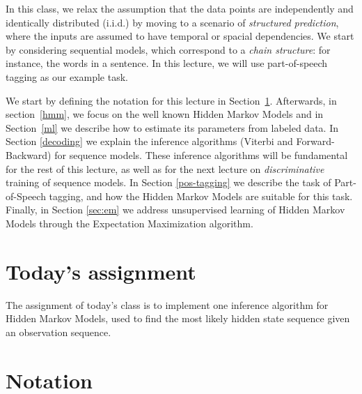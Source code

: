 

In this class, we relax the assumption that
the data points are independently and identically distributed (i.i.d.) 
by moving to a scenario of \emph{structured prediction}, where the inputs are assumed to have
temporal or spacial dependencies. We start by 
considering sequential models, which correspond to a \emph{chain structure}: for instance,
the words in a sentence. In this lecture, we will use part-of-speech
tagging as our example task.  

We start by defining the notation for this lecture in Section~\ref{notation}.
Afterwards, in section~\ref{hmm}, we focus on the well known Hidden Markov Models and in Section~\ref{ml} we describe how to estimate its parameters from labeled data. In Section \ref{decoding} we explain the inference
algorithms (Viterbi and Forward-Backward) for sequence models. These
inference algorithms will be fundamental for the rest of this lecture,
as well as for the next lecture on \emph{discriminative} training of sequence
models. In Section \ref{pos-tagging} we describe the task of 
Part-of-Speech tagging, and how the Hidden Markov Models are suitable for this task. 
Finally, in Section \ref{sec:em} we 
address unsupervised learning of Hidden Markov Models through the Expectation Maximization
algorithm.

\section*{Today's assignment}

The assignment of today's class is to implement one inference algorithm for Hidden Markov Models, used to find the most likely hidden state sequence given an observation sequence.

\section{Notation}\label{notation}

